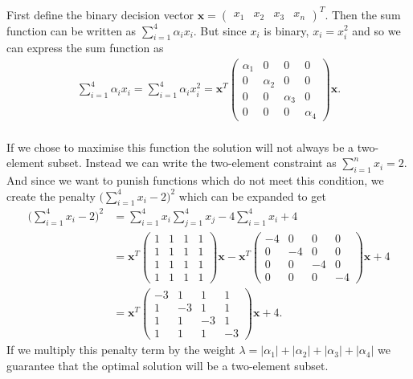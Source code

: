 \documentclass{article}
\begin{document}
\noindent First define the binary decision vector \(\mathbf{x} = \begin{pmatrix}
	x_1 & x_2 & x_3 & x_n
	\end{pmatrix}^T\). 
Then the sum function can be written as \(\sum_{i=1}^4 \alpha_i x_i\). But since \(x_i\) is binary, \(x_i = x_i^2\) and so we can express the sum function as
\begin{align*}
\sum_{i=1}^4 \alpha_i x_i = \sum_{i=1}^4 \alpha_i x_i^2 = \mathbf{x}^T\begin{pmatrix}
	\alpha_1 & 0 & 0 & 0 \\
	0 & \alpha_2 & 0 & 0 \\
	0 & 0 & \alpha_3 & 0 \\ 
	0 & 0 & 0 & \alpha_4
\end{pmatrix}\mathbf{x}.
\end{align*} \\ 

\noindent If we chose to maximise this function the solution will not always be a two-element subset. Instead we can write the two-element constraint as \(\sum_{i=1}^n x_i = 2\). And since we want to punish functions which do not meet this condition, we create the penalty \(\bigg(\sum_{i=1}^4 x_i - 2\bigg)^2\) which can be expanded to get
\begin{align*}
	\bigg(\sum_{i=1}^4 x_i - 2\bigg)^2 &= \sum_{i=1}^4 x_i\sum_{j=1}^4 x_j - 4\sum_{i=1}^4 x_i + 4 \\
	&= \mathbf{x}^T \begin{pmatrix}
		1 & 1 & 1 & 1 \\
		1 & 1 & 1 & 1 \\
		1 & 1 & 1 & 1 \\
		1 & 1 & 1 & 1
	\end{pmatrix}\mathbf{x} - \mathbf{x}^T \begin{pmatrix}
		-4 & 0 & 0 & 0 \\
		0 & -4 & 0 & 0 \\
		0 & 0 & -4 & 0 \\
		0 & 0 & 0 & -4 
	\end{pmatrix}\mathbf{x} + 4 \\
	&= \mathbf{x}^T \begin{pmatrix}
		-3 & 1 & 1 & 1 \\
		1 & -3 & 1 & 1 \\
		1 & 1 & -3 & 1 \\
		1 & 1 & 1 & -3
	\end{pmatrix} \mathbf{x} + 4.
\end{align*}
If we multiply this penalty term by the weight \(\lambda = |\alpha_1| + |\alpha_2| + |\alpha_3| + |\alpha_4|\) we guarantee that the optimal solution will be a two-element subset. \\
\end{document}
